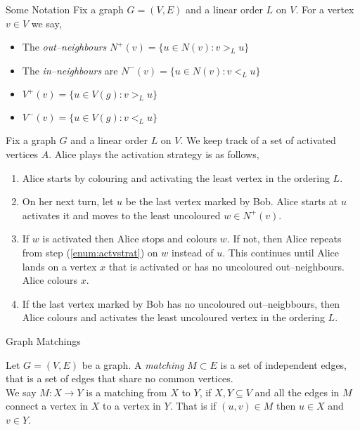 \documentclass[handout]{beamer}
\begin{document}
\begin{frame}{\secname}{Some Notation}
Fix a graph $G=(V,E)$ and a linear order $L$ on $V$. For a vertex $v\in V$ we say,
\begin{itemize}        
    \item The \textit{out--neighbours} $N^+(v)=\{u\in N(v):v>_L u\}$ 
    \item The \textit{in--neighbours} are $N^-(v)=\{u\in N(v):v<_L u\}$ 
    \item $V^+(v)=\{u\in V(g):v>_L u\}$     
    \item $V^-(v)=\{u\in V(g):v<_L u\}$ 
\end{itemize}
\end{frame}


\begin{frame}{\secname}
    Fix a graph $G$ and a linear order $L$ on $V$. We keep track of a set of activated vertices $A$. Alice plays the activation strategy is as follows,
    \begin{enumerate}
        \item Alice starts by colouring and activating the least vertex in the ordering $L$.
        \pause
        \item On her next turn, let $u$ be the last vertex marked by Bob.  Alice starts at $u$ activates it and moves to the least uncoloured $w\in N^+(v)$.
        \pause \label{enum:actvstrat}
        \item If $w$ is activated then Alice stops and colours $w$. If not, then Alice repeats from step (\ref{enum:actvstrat}) on $w$ instead of $u$. 
        This continues until Alice lands on a vertex $x$ that is activated or has no uncoloured out--neighbours. Alice colours $x$.
        \pause
        \item If the last vertex marked by Bob has no uncoloured out--neigbbours, then Alice colours and activates the least uncoloured vertex in the ordering $L$.
    \end{enumerate}
\end{frame}


\begin{frame}{\secname}{Graph Matchings}
    
    
    \begin{definition}[Matching]
        Let $G=(V,E)$ be a graph. A \textit{matching} $M\subset E$ is a set of independent edges, that is a set of edges that share no common vertices.\\
        
         We say $M:X \to Y$ is a matching from $X$ to $Y$, if $X,Y\subseteq V$ and all the edges in $M$ connect a vertex in $X$ to a vertex in $Y$. That is if $(u,v)\in M$ then $u\in X$ and $v\in Y$. 
        
    \end{definition}

\end{frame}
\end{document}
